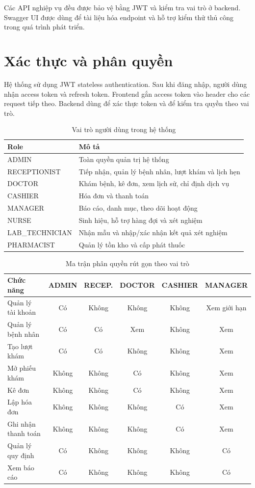 Các API nghiệp vụ đều được bảo vệ bằng JWT và kiểm tra vai trò ở backend. Swagger UI được dùng để tài liệu hóa endpoint và hỗ trợ kiểm thử thủ công trong quá trình phát triển.

\section{Xác thực và phân quyền}

Hệ thống sử dụng JWT stateless authentication. Sau khi đăng nhập, người dùng nhận access token và refresh token. Frontend gắn access token vào header  cho các request tiếp theo. Backend dùng  để xác thực token và  để kiểm tra quyền theo vai trò.

\begin{table}[H]
\centering
\caption{Vai trò người dùng trong hệ thống}
\begin{tabularx}{\textwidth}{|p{4cm}|X|}
\hline
\textbf{Role} & \textbf{Mô tả} \\
\hline
ADMIN & Toàn quyền quản trị hệ thống \\
\hline
RECEPTIONIST & Tiếp nhận, quản lý bệnh nhân, lượt khám và lịch hẹn \\
\hline
DOCTOR & Khám bệnh, kê đơn, xem lịch sử, chỉ định dịch vụ \\
\hline
CASHIER & Hóa đơn và thanh toán \\
\hline
MANAGER & Báo cáo, danh mục, theo dõi hoạt động \\
\hline
NURSE & Sinh hiệu, hỗ trợ hàng đợi và xét nghiệm \\
\hline
LAB\_TECHNICIAN & Nhận mẫu và nhập/xác nhận kết quả xét nghiệm \\
\hline
PHARMACIST & Quản lý tồn kho và cấp phát thuốc \\
\hline
\end{tabularx}
\end{table}

\begin{longtable}{|p{4cm}|c|c|c|c|c|}
\caption{Ma trận phân quyền rút gọn theo vai trò}\\
\hline
\textbf{Chức năng} & \textbf{ADMIN} & \textbf{RECEP.} & \textbf{DOCTOR} & \textbf{CASHIER} & \textbf{MANAGER} \\
\hline
Quản lý tài khoản & Có & Không & Không & Không & Xem giới hạn \\
\hline
Quản lý bệnh nhân & Có & Có & Xem & Không & Xem \\
\hline
Tạo lượt khám & Có & Có & Không & Không & Xem \\
\hline
Mở phiếu khám & Không & Không & Có & Không & Xem \\
\hline
Kê đơn & Không & Không & Có & Không & Xem \\
\hline
Lập hóa đơn & Không & Không & Không & Có & Xem \\
\hline
Ghi nhận thanh toán & Không & Không & Không & Có & Xem \\
\hline
Quản lý quy định & Có & Không & Không & Không & Có \\
\hline
Xem báo cáo & Có & Không & Không & Không & Có \\
\hline
\end{longtable}

